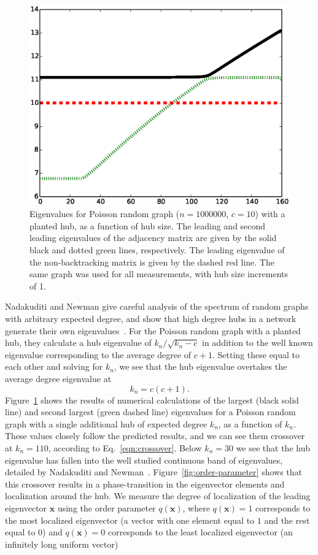 \documentclass[twocolumn,prl,superscriptaddress]{revtex4}
\renewcommand{\vec}{\mathbf}
\begin{document}
\begin{figure}
\begin{center}
\includegraphics[width=\columnwidth]{eig.eps}
\end{center}
\caption{Eigenvalues for Poisson random graph ($n=1000000$, $c=10$) with a planted hub, as a function of hub size. The leading and second leading eigenvalues of the adjacency matrix are given by the solid black and dotted green lines, respectively. The leading eigenvalue of the non-backtracking matrix is given by the dashed red line. The same graph was used for all measurements, with hub size increments of 1.}
\label{fig:evalues}
\end{figure}
Nadakuditi and Newman give careful analysis of the spectrum of random graphs with arbitrary expected degree, and show that high degree hubs in a network generate their own eigenvalues~\cite{nadakuditi13}. For the Poisson random graph with a planted hub, they calculate a hub eigenvalue of $k_n / \sqrt{k_n - c}$ in addition to the well known eigenvalue corresponding to the average degree of $c+1$. Setting these equal to each other and solving for $k_n$, we see that the hub eigenvalue overtakes the average degree eigenvalue at
\begin{equation}
k_n = c(c+1).
\label{eqn:crossover}
\end{equation}
Figure~\ref{fig:evalues} shows the results of numerical calculations of the largest (black solid line) and second largest (green dashed line) eigenvalues for a Poisson random graph with a single additional hub of expected degree $k_n$, as a function of $k_n$. These values closely follow the predicted results, and we can see them crossover at $k_n = 110$, according to Eq.~\ref{eqn:crossover}. Below $k_n = 30$ we see that the hub eigenvalue has fallen into the well studied continuous band of eigenvalues, detailed by Nadakuditi and Newman~\cite{nadakuditi13}. Figure~\ref{fig:order-parameter} shows that this crossover results in a phase-transition in the eigenvector elements and localization around the hub. We measure the degree of localization of the leading eigenvector $\vec{x}$ using the order parameter $q(\vec{x})$, where $q(\vec{x}) = 1$ corresponds to the most localized eigenvector (a vector with one element equal to $1$ and the rest equal to $0$) and $q(\vec{x}) = 0$ corresponds to the least localized eigenvector (an infinitely long uniform vector)
\end{document}
